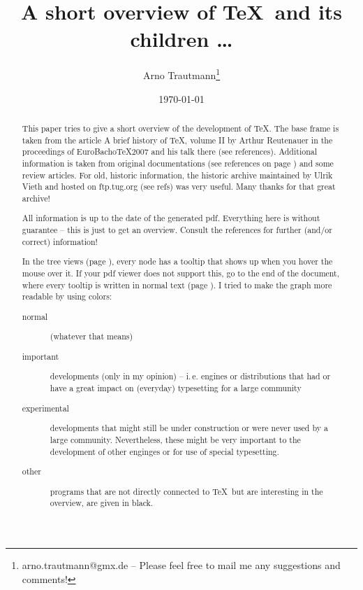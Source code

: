 \documentclass{scrartcl}
\title{A short overview of \TeX\ and its children \dots}
\author{Arno Trautmann\thanks{arno.trautmann@gmx.de -- Please feel free to mail me any suggestions and comments!}}
\date{\today}
\def\vip{1 0 0}
\def\other{0 0 0}
\def\normalimportant{0 0.5 0}
\def\experimental{0 .7 .7}
\begin{document}
\maketitle

\begin{abstract}
This paper tries to give a short overview of the development of \TeX. The base frame is taken from the article \textsf{A brief history of \TeX, volume II} by Arthur Reutenauer in the proceedings of \textsf{EuroBacho\TeX 2007} and his talk there (see references). Additional information is taken from original documentations (see references on page \pageref{sec:refs}) and some review articles. For old, historic information, the \textsf{historic archive} maintained by Ulrik Vieth and hosted on ftp.tug.org (see refs) was very useful. Many thanks for that great archive!

All information is up to the date of the generated pdf. Everything here is without guarantee -- this is just to get an overview. Consult the references for further (and/or correct) information!

In the tree views (page \pageref{sec:tree}), every node has a tooltip that shows up when you hover the mouse over it. If your pdf viewer does not support this, go to the end of the document, where every tooltip is written in normal text (page \pageref{sec:text}). I tried to make the graph more readable by using colors:

\begin{description}
\item[{\color[rgb]{\normalimportant} normal}] (whatever that means)
\item[{\color[rgb]{\vip} important}] developments (only in my opinion) -- i.\,e. engines or distributions that had or have a great impact on (everyday) typesetting for a large community
\item[{\color[rgb]{\experimental} experimental}] developments that might still be under construction or were never used by a large community. Nevertheless, these might be very important to the development of other enginges or for use of special typesetting. \item[{\color[rgb]{\other} other}] programs that are not directly connected to \TeX\ but are interesting in the overview, are given in black.
\end{description}
\end{abstract}

\tableofcontents

\clearpage
\end{document}
